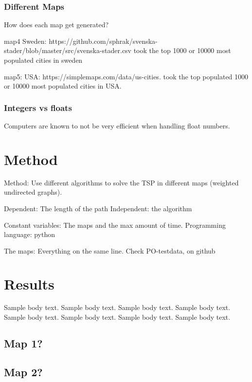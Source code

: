 \documentclass{article}
\begin{document}
\subsubsection{Different Maps}\label{subsubsec1}
How does each map get generated?

map4 Sweden: https://github.com/sphrak/svenska-stader/blob/master/src/svenska-stader.csv  took the top 1000 or 10000 most populated cities in sweden

map5: USA: https://simplemaps.com/data/us-cities. took the top populated 1000 or 10000 most populated cities in USA.


\subsubsection{Integers vs floats}\label{subsubsec1}
Computers are known to not be very efficient when handling float numbers.

\section{Method}\label{sec2}
Method:
Use different algorithms to solve the TSP in different maps (weighted undirected graphs).




Dependent: The length of the path
Independent: the algorithm


Constant variables: The maps and the max amount of time. Programming language: python

The maps: Everything on the same line. Check PO-testdata, on github










\section{Results}\label{sec3}

Sample body text. Sample body text. Sample body text. Sample body text. Sample body text. Sample body text. Sample body text. Sample body text.

\subsection{Map 1?}\label{subsec1}

\subsection{Map 2?}\label{subsec2}
\end{document}
